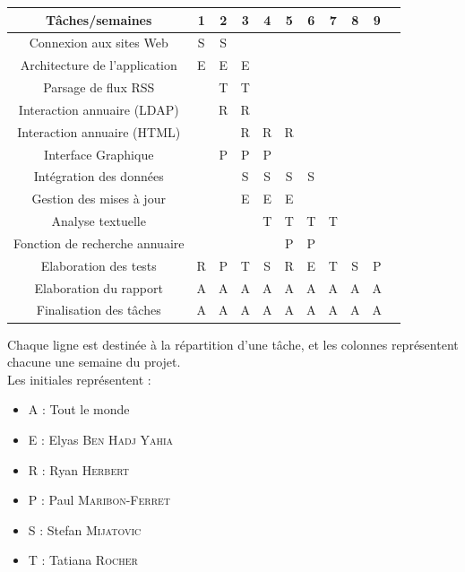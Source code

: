 \documentclass [pdftex,12pt] {report}
\begin{document}
\begin{table}[h!]
    \begin{tabular}{|c|c|c|c|c|c|c|c|c|c|c|}
        \hline
        Tâches/semaines                       & 1 & 2 & 3 & 4 & 5 & 6 & 7 & 8 & 9 \\ \hline
        Connexion aux sites Web               & S & S & ~ & ~ & ~ & ~ & ~ & ~ & ~ \\ \hline
        Architecture de l'application         & E & E & E & ~ & ~ & ~ & ~ & ~ & ~ \\ \hline
        Parsage de flux RSS                   & ~ & T & T & ~ & ~ & ~ & ~ & ~ & ~ \\ \hline
        Interaction annuaire (LDAP)    		  & ~ & R & R & ~ & ~ & ~ & ~ & ~ & ~ \\ \hline
        Interaction annuaire (HTML)			  & ~ & ~ & R & R & R & ~ & ~ & ~ & ~ \\ \hline
        Interface Graphique                   & ~ & P & P & P & ~ & ~ & ~ & ~ & ~ \\ \hline
        Intégration des données				  & ~ & ~ & S & S & S & S & ~ & ~ & ~ \\ \hline
        Gestion des mises à jour              & ~ & ~ & E & E & E & ~ & ~ & ~ & ~ \\ \hline
        Analyse textuelle                     & ~ & ~ & ~ & T & T & T & T & ~ & ~ \\ \hline
        Fonction de recherche annuaire 		  & ~ & ~ & ~ & ~ & P & P & ~ & ~ & ~ \\ \hline
        Elaboration des tests                 & R & P & T & S & R & E & T & S & P \\ \hline
        Elaboration du rapport                & A & A & A & A & A & A & A & A & A \\ \hline
        Finalisation des tâches               & A & A & A & A & A & A & A & A & A \\
        \hline
    \end{tabular}
\end{table}
Chaque ligne est destinée à la répartition d'une tâche, et les colonnes représentent chacune une semaine du projet.\\
Les initiales représentent :\\
\begin{itemize}
\item A : Tout le monde
\item E : Elyas \textsc{Ben Hadj Yahia}
\item R : Ryan \textsc{Herbert}
\item P : Paul \textsc{Maribon-Ferret}
\item S : Stefan \textsc{Mijatovic}
\item T : Tatiana \textsc{Rocher}
\end{itemize}
\end{document}
